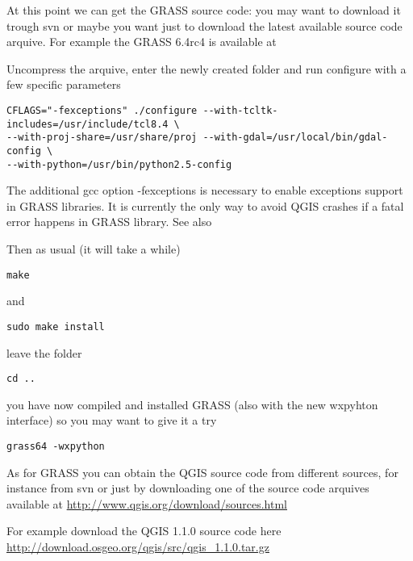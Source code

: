 At this point we can get the GRASS source code: you may want to download it
trough svn or maybe you want just to download the latest available source code arquive.
For example the GRASS 6.4rc4 is available at 

Uncompress the arquive, enter the newly created folder and run configure with a few specific parameters

\begin{verbatim}
CFLAGS="-fexceptions" ./configure --with-tcltk-includes=/usr/include/tcl8.4 \
--with-proj-share=/usr/share/proj --with-gdal=/usr/local/bin/gdal-config \
--with-python=/usr/bin/python2.5-config
\end{verbatim}

The additional gcc option -fexceptions is necessary to enable exceptions support in GRASS libraries. It is currently the only way to avoid QGIS crashes if a fatal error happens in GRASS library. See also 

Then as usual (it will take a while)

\begin{verbatim}
make
\end{verbatim}

and

\begin{verbatim}
sudo make install
\end{verbatim}

leave the folder 

\begin{verbatim}
cd ..
\end{verbatim}

you have now compiled and installed GRASS (also with the new wxpyhton interface) so you
may want to give it a try

\begin{verbatim}
grass64 -wxpython
\end{verbatim}

\hypertarget{toc60}{}
As for GRASS you can obtain the QGIS source code from different sources,
for instance from svn or just by downloading one of the source code arquives available
at \url{http://www.qgis.org/download/sources.html}

For example download the QGIS 1.1.0 source code here \\
\url{http://download.osgeo.org/qgis/src/qgis\_1.1.0.tar.gz}


